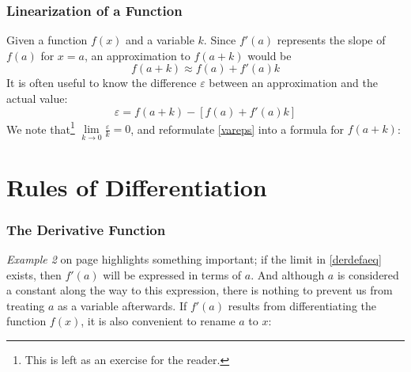 \subsubsection{Linearization of a Function}
Given a function $ f(x) $ and a variable $ k $. Since $ f'(a) $ represents the slope of $ f(a) $ for $ x=a $, an approximation to $ f(a+k) $ would be
\[ f(a+k)\approx f(a)+f'(a)k \]
It is often useful to know the difference $ \varepsilon $ between an approximation and the actual value:
\begin{equation}\label{vareps}
	\varepsilon = f(a+k)-\left[f(a)+f'(a)k\right]
\end{equation}
We note that\footnote{This is left as an exercise for the reader.} $ \lim\limits_{k\to0}\frac{\varepsilon}{k} =0 $, and reformulate \eqref{vareps} into a formula for $ f(a+k) $: \regv
{}

\section{Rules of Differentiation}
\subsubsection{The Derivative Function}
\textsl{Example 2} on page \pageref{dereks2} highlights something important; if the limit in \eqref{derdefaeq} exists, then $ f'(a) $ will be expressed in terms of $ a $. And although $ a $ is considered a constant along the way to this expression, there is nothing to prevent us from treating $ a $ as a variable afterwards. If $ f'(a) $ results from differentiating the function $ f(x) $, it is also convenient to rename $ a $ to $ x $:\regv
{}
 \regv

